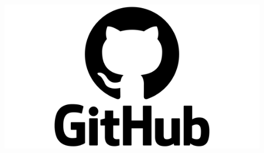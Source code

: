 \documentclass[9pt, aspectratio=169]{beamer}
\newcommand{\backupend}{
   \setcounter{framenumber}{\value{finalframe}}
}
\begin{document}
\begin{frame}
\begin{columns}
\begin{column}{0.1\textwidth}
\begin{center}
	\end{center}
\end{column}
\hspace{-0.6cm}
\begin{column}{0.1\textwidth}
	\begin{center}
  		\includegraphics[width=0.9\textwidth]{GitHub} 
	\end{center}
\end{column}
\end{columns}
\end{frame}



\backupend
\end{document}
